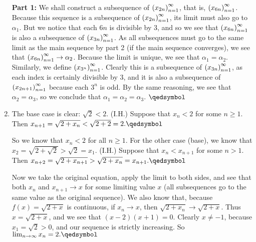 \documentclass[12pt]{article}
\theoremstyle{definition}
\theoremstyle{remark}
\renewcommand{\qed}{\hfill\qedsymbol}
\renewcommand{\geq}{\geqslant}
\begin{document}
\begin{enumerate}[leftmargin=\labelsep]
		\textbf{Part 1:}  We shall construct a subsequence of $\qty(x_{2n})_{n=1}^{\infty}$, that is, $\qty(x_{6n})_{n=1}^{\infty}$. Because this sequence is a subsequence of $\qty(x_{2n})_{n=1}^{\infty}$, its limit must also go to $\alpha_1$. But we notice that each $6n$ is divisible by 3, and so we see that $\qty(x_{6n})_{n=1}^{\infty}$ is also a subsequence of $\qty(x_{3n})_{n=1}^{\infty}$. As all subsequences must go to the same limit as the main sequence by part 2 (if the main sequence converges), we see that $\qty(x_{6n})_{n=1}^{\infty} \to \alpha_2$. Because the limit is unique, we see that $\alpha_1 = \alpha_2$. Similarly, we define $\qty(x_{3^n})_{n=1}^{\infty}$. Clearly this is a subsequence of $\qty(x_{3n})_{n=1}^{\infty}$, as each index is certainly divisible by 3, and it is also a subsequence of $\qty(x_{2n+1})_{n=1}^{\infty}$ because each $3^n$ is odd. By the same reasoning, we see that $\alpha_2 = \alpha_3$, so we conclude that $\alpha_1=\alpha_2=\alpha_3$. $\qed$
					
		\item 
		The base case is clear: $\sqrt{2} < 2$. (I.H.) Suppose that $x_n < 2$ for some $n \geq 1$. Then $x_{n+1} = \sqrt{2+x_n} < \sqrt{2+2} = 2. \qed$
		
		So we know that $x_n < 2$ for all $n \geq 1$. 
		For the other case (base), we know that $x_2 = \sqrt{2+\sqrt{2}} > \sqrt{2}=x_1$. (I.H.) Suppose that $x_n < x_{n+1}$ for some $n > 1$. Then $x_{n+2} = \sqrt{2+x_{n+1}} > \sqrt{2+x_{n}}=x_{n+1}. \qed$
		
		Now we take the original equation, apply the limit to both sides, and see that both $x_n$ and $x_{n+1} \to x$ for some limiting value $x$ (all subsequences go to the same value as the original sequence). We also know that, because $f(x) = \sqrt{2+x}$ is continuous, if $x_n \to x$, then $\sqrt{2+x_n} \to \sqrt{2+x}$. Thus $x = \sqrt{2+x}$, and we see that $(x-2)(x+1)=0$. Clearly $x \neq -1$, because $x_1 = \sqrt{2} > 0$, and our sequence is strictly increasing. So $\lim_{n \to \infty} x_n = 2. \qed$
		\end{enumerate}
\end{document}
